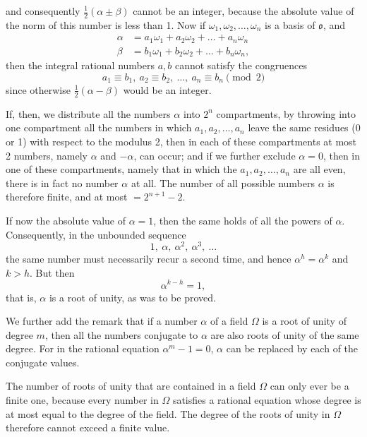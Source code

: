 and consequently $\frac{1}{2}(\alpha \pm \beta)$ cannot be an integer, because the
absolute value of the norm of this number is less than 1. Now
if $\omega_1, \omega_2, \dots, \omega_n$ is a basis of $\mathfrak{o}$, and
\[
\begin{aligned}
\alpha &= a_1\omega_1 + a_2\omega_2 + \dots + a_n\omega_n \\
\beta &= b_1\omega_1 + b_2\omega_2 + \dots + b_n\omega_n,
\end{aligned}
\]
then the integral rational numbers $a, b$ cannot satisfy the congruences
\[ a_1 \equiv b_1,\ a_2 \equiv b_2,\ \dots,\ a_n \equiv b_n \pmod{2} \]
since otherwise $\frac{1}{2}(\alpha - \beta)$ would be an integer.

If, then, we distribute all the numbers $\alpha$ into $2^n$ compartments,
by throwing into one compartment all the numbers in which
$a_1, a_2, \dots, a_n$ leave the same residues (0 or 1) with respect to the modulus 2,
then in each of these compartments at most 2 numbers,
namely $\alpha$ and $-\alpha$, can occur; and if we further exclude
$\alpha = 0$, then in one of these compartments, namely that in which
the $a_1, a_2, \dots, a_n$ are all even, there is in fact no number $\alpha$ at all. The number
of all possible numbers $\alpha$ is therefore finite, and at most
$= 2^{n+1} - 2$.

If now the absolute value of $\alpha = 1$, then the same holds
of all the powers of $\alpha$. Consequently, in the unbounded
sequence
\[ 1,\ \alpha,\ \alpha^2,\ \alpha^3,\ \dots \]
the same number must necessarily recur a second time, and hence
$\alpha^h = \alpha^k$ and $k > h$. But then
\[ \alpha^{k-h} = 1, \]
that is, $\alpha$ is a root of unity, as was to be proved.

We further add the remark that if a number $\alpha$
of a field $\Omega$ is a root of unity of degree $m$, then all
the numbers conjugate to $\alpha$ are also roots of unity of the same degree.
For in the rational equation $\alpha^m - 1 = 0$, $\alpha$ can be
replaced by each of the conjugate values.

The number of roots of unity that are contained in a field $\Omega$
can only ever be a finite one, because every
number in $\Omega$ satisfies a rational equation whose degree is
at most equal to the degree of the field. The degree of the roots of unity
in $\Omega$ therefore cannot exceed a finite value.
